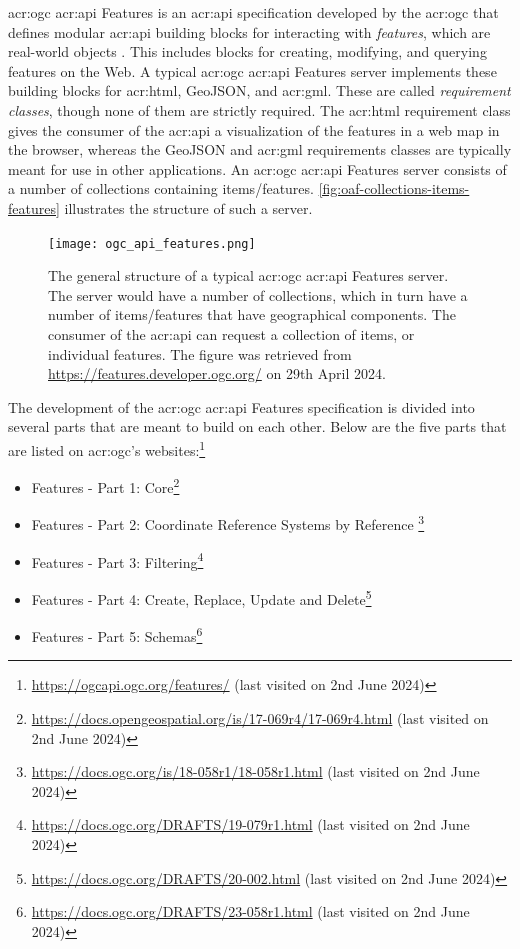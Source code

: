\acrshort{acr:ogc} \acrshort{acr:api} Features is an \acrshort{acr:api} specification developed by the \acrfull{acr:ogc} that defines modular \acrshort{acr:api} building blocks for interacting with \textit{features}, which are real-world objects \citep{opengeospatialconsortiumOGCAPIFeatures2022}. This includes blocks for creating, modifying, and querying features on the Web. A typical \acrshort{acr:ogc} \acrshort{acr:api} Features server implements these building blocks for \acrshort{acr:html}, GeoJSON, and \acrshort{acr:gml}. These are called \textit{requirement classes}, though none of them are strictly required. The \acrshort{acr:html} requirement class gives the consumer of the \acrshort{acr:api} a visualization of the features in a web map in the browser, whereas the GeoJSON and \acrshort{acr:gml} requirements classes are typically meant for use in other applications. An \acrshort{acr:ogc} \acrshort{acr:api} Features server consists of a number of collections containing items/features. \autoref{fig:oaf-collections-items-features} illustrates the structure of such a server.

\begin{figure}[h]
    \centering
    \texttt{[image: ogc\_api\_features.png]}
    \caption[The general structure of a typical OGC API Features server]{The general structure of a typical \acrshort{acr:ogc} \acrshort{acr:api} Features server. The server would have a number of collections, which in turn have a number of items/features that have geographical components. The consumer of the \acrshort{acr:api} can request a collection of items, or individual features. The figure was retrieved from \url{https://features.developer.ogc.org/} on 29th April 2024.}
    \label{fig:oaf-collections-items-features}
\end{figure}

\newpage

The development of the \acrshort{acr:ogc} \acrshort{acr:api} Features specification is divided into several parts that are meant to build on each other. Below are the five parts that are listed on \acrshort{acr:ogc}'s websites:\footnote{\url{https://ogcapi.ogc.org/features/} (last visited on 2nd June 2024)}

\begin{itemize}
    \item Features - Part 1: Core\footnote{\url{https://docs.opengeospatial.org/is/17-069r4/17-069r4.html} (last visited on 2nd June 2024)}
    \item Features - Part 2: Coordinate Reference Systems by Reference \footnote{\url{https://docs.ogc.org/is/18-058r1/18-058r1.html} (last visited on 2nd June 2024)}
    \item Features - Part 3: Filtering\footnote{\url{https://docs.ogc.org/DRAFTS/19-079r1.html} (last visited on 2nd June 2024)}
    \item Features - Part 4: Create, Replace, Update and Delete\footnote{\url{https://docs.ogc.org/DRAFTS/20-002.html} (last visited on 2nd June 2024)}
    \item Features - Part 5: Schemas\footnote{\url{https://docs.ogc.org/DRAFTS/23-058r1.html} (last visited on 2nd June 2024)}
\end{itemize}

